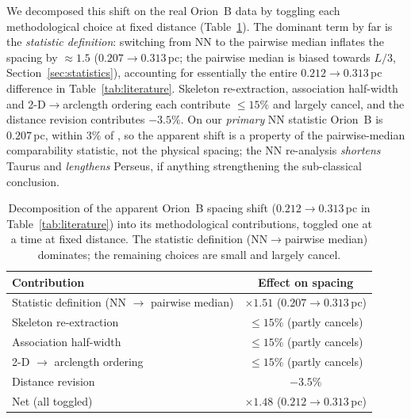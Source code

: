 \documentclass[usenatbib,twoside,twocolumn]{mnras}
\begin{document}
We decomposed this shift on the real Orion~B data by toggling each methodological choice at fixed distance (Table~\ref{tab:decomp}). The dominant term by far is the \emph{statistic definition}: switching from NN to the pairwise median inflates the spacing by $\approx1.5$ ($0.207\to0.313$\,pc; the pairwise median is biased towards $L/3$, Section~\ref{sec:statistics}), accounting for essentially the entire $0.212\to0.313$\,pc difference in Table~\ref{tab:literature}. Skeleton re-extraction, association half-width and 2-D$\to$arclength ordering each contribute $\le15\%$ and largely cancel, and the distance revision contributes $-3.5\%$. On our \emph{primary} NN statistic Orion~B is $0.207$\,pc, within $3\%$ of \citet{Konyves2020}, so the apparent shift is a property of the pairwise-median comparability statistic, not the physical spacing; the NN re-analysis \emph{shortens} Taurus and \emph{lengthens} Perseus, if anything strengthening the sub-classical conclusion.

\begin{table}
\caption{Decomposition of the apparent Orion~B spacing shift ($0.212\to0.313$\,pc in Table~\ref{tab:literature}) into its methodological contributions, toggled one at a time at fixed distance. The statistic definition (NN$\to$pairwise median) dominates; the remaining choices are small and largely cancel.}
\label{tab:decomp}
\footnotesize
\setlength{\tabcolsep}{4pt}
\begin{tabular}{lc}
\toprule
Contribution & Effect on spacing \\
\midrule
Statistic definition (NN $\to$ pairwise median) & $\times1.51$ ($0.207\!\to\!0.313$\,pc) \\
Skeleton re-extraction & $\le15\%$ (partly cancels) \\
Association half-width & $\le15\%$ (partly cancels) \\
2-D $\to$ arclength ordering & $\le15\%$ (partly cancels) \\
Distance revision & $-3.5\%$ \\
\midrule
Net (all toggled) & $\times1.48$ ($0.212\!\to\!0.313$\,pc) \\
\bottomrule
\end{tabular}
\end{table}
\end{document}
